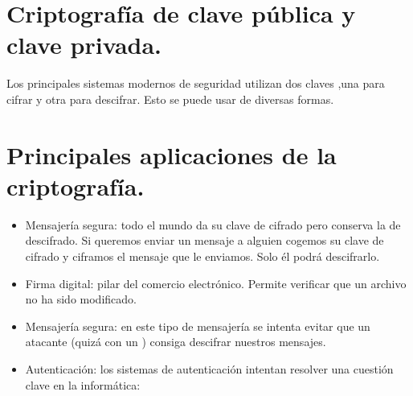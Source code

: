 \documentclass[letterpaper,10pt,spanish]{sphinxmanual}
\begin{document}
\begin{sphinxVerbatim}[commandchars=\\\{\}]
                 
          
                   
                 

                 
           \PYG{o}{[}\PYG{o}{]} 
                  
                  
\end{sphinxVerbatim}


\section{Criptografía de clave pública y clave privada.}
\label{\detokenize{textos/tema5:criptografia-de-clave-publica-y-clave-privada}}
Los principales sistemas modernos de seguridad utilizan dos claves ,una para cifrar y otra para descifrar. Esto se puede usar de diversas formas.


\section{Principales aplicaciones de la criptografía.}
\label{\detokenize{textos/tema5:principales-aplicaciones-de-la-criptografia}}\begin{itemize}
\item {} 
Mensajería segura: todo el mundo da su clave de cifrado pero conserva la de descifrado. Si queremos enviar un mensaje a alguien cogemos su clave de cifrado y ciframos el mensaje que le enviamos. Solo él podrá descifrarlo.

\item {} 
Firma digital: pilar del comercio electrónico. Permite verificar que un archivo no ha sido modificado.

\item {} 
Mensajería segura: en este tipo de mensajería se intenta evitar que un atacante (quizá con un ) consiga descifrar nuestros mensajes.

\item {} 
Autenticación: los sistemas de autenticación intentan resolver una cuestión clave en la informática: 

\end{itemize}
\end{document}
